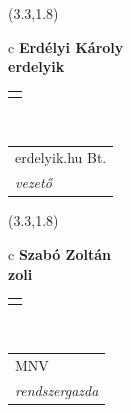 \documentclass[11pt]{article}
\begin{document}
\makebox(3.3,1.8){
  \renewcommand\arraystretch{1.3}
  \begin{tabular}[c]{c}
    \hspace{8.5mm}
    \LARGE\bf{ Erdélyi Károly }\\
    \hspace{8.5mm}
    \Large{ erdelyik }\\
    \renewcommand\arraystretch{3}
    \begin{tabular}[c]{c}
      \centering
      \fontfamily{phv}\selectfont{
        \textbf{
          \textsc{
            \scriptsize{
            \color{Bright}{ Ismerkedő }\color{Dark}{ Webmester }\color{Bright}{ Sminkmester }\color{Bright}{ Programozó }
            }
          }
        }
      }
    \end{tabular}
    \\
    \renewcommand\arraystretch{1}
    \begin{tabular}{p{3.3in}}
      \hspace{.7cm}erdelyik.hu Bt.\\
      \hspace{.7cm}\emph{ vezető }\\
    \end{tabular}
  \end{tabular}
}

\makebox(3.3,1.8){
  \renewcommand\arraystretch{1.3}
  \begin{tabular}[c]{c}
    \hspace{8.5mm}
    \LARGE\bf{ Szabó Zoltán }\\
    \hspace{8.5mm}
    \Large{ zoli }\\
    \renewcommand\arraystretch{3}
    \begin{tabular}[c]{c}
      \centering
      \fontfamily{phv}\selectfont{
        \textbf{
          \textsc{
            \scriptsize{
            \color{Dark}{ Ismerkedő }\color{Bright}{ Webmester }\color{Bright}{ Sminkmester }\color{Bright}{ Programozó }
            }
          }
        }
      }
    \end{tabular}
    \\
    \renewcommand\arraystretch{1}
    \begin{tabular}{p{3.3in}}
      \hspace{.7cm}MNV\\
      \hspace{.7cm}\emph{ rendszergazda }\\
    \end{tabular}
  \end{tabular}
}
\end{document}
